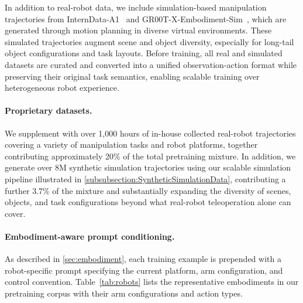\documentclass{llmxive}
\begin{document}
In addition to real-robot data, we include simulation-based manipulation
trajectories from InternData-A1~\citep{interndata-a1} and
GR00T-X-Embodiment-Sim~\citep{nvidia2025gr00t}, which are generated through motion
planning in diverse virtual environments. These simulated trajectories augment
scene and object diversity, especially for long-tail object configurations and
task layouts. Before training, all real and simulated datasets are curated and
converted into a unified observation-action format while preserving their
original task semantics, enabling scalable training over heterogeneous robot
experience.
\paragraph{Proprietary datasets.}
We supplement with over 1{,}000 hours of in-house collected real-robot trajectories
covering a variety of manipulation tasks and robot platforms, together
contributing approximately 20\% of the total pretraining mixture.
In addition, we generate over 8M synthetic simulation trajectories using our
scalable simulation pipeline illustrated in \cref{subsubsection:SyntheticSimulationData}, contributing a further 3.7\%
of the mixture and substantially expanding the diversity of scenes, objects,
and task configurations beyond what real-robot teleoperation alone can cover.

\paragraph{Embodiment-aware prompt conditioning.}
As described in \cref{sec:embodiment}, each training example is prepended with
a robot-specific prompt specifying the current platform, arm configuration, and
control convention.
Table~\ref{tab:robots} lists the representative embodiments in our pretraining
corpus with their arm configurations and action types.
\end{document}
